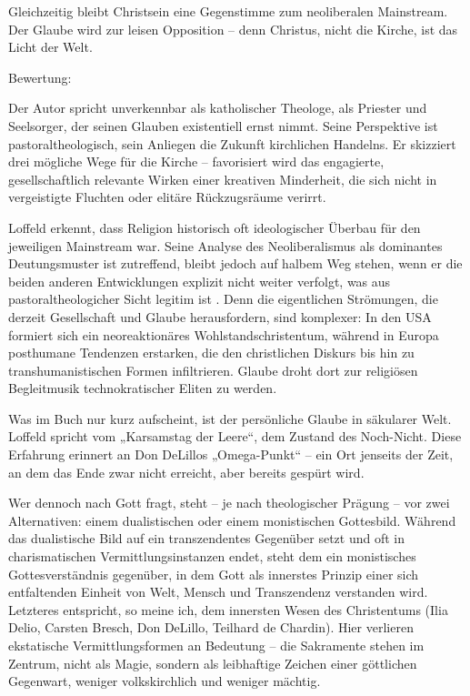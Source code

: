 \documentclass[
]{article}
\begin{document}
Gleichzeitig bleibt Christsein eine Gegenstimme zum neoliberalen Mainstream. Der Glaube wird zur leisen Opposition -- denn Christus, nicht die Kirche, ist das Licht der Welt.

Bewertung:

Der Autor spricht unverkennbar als katholischer Theologe, als Priester und Seelsorger, der seinen Glauben existentiell ernst nimmt. Seine Perspektive ist pastoraltheologisch, sein Anliegen die Zukunft kirchlichen Handelns. Er skizziert drei mögliche Wege für die Kirche -- favorisiert wird das engagierte, gesellschaftlich relevante Wirken einer kreativen Minderheit, die sich nicht in vergeistigte Fluchten oder elitäre Rückzugsräume verirrt.

Loffeld erkennt, dass Religion historisch oft ideologischer Überbau für den jeweiligen Mainstream war. Seine Analyse des Neoliberalismus als dominantes Deutungsmuster ist zutreffend, bleibt jedoch auf halbem Weg stehen, wenn er die beiden anderen Entwicklungen explizit nicht weiter verfolgt, was aus pastoraltheologicher Sicht legitim ist . Denn die eigentlichen Strömungen, die derzeit Gesellschaft und Glaube herausfordern, sind komplexer: In den USA formiert sich ein neoreaktionäres Wohlstandschristentum, während in Europa posthumane Tendenzen erstarken, die den christlichen Diskurs bis hin zu transhumanistischen Formen infiltrieren. Glaube droht dort zur religiösen Begleitmusik technokratischer Eliten zu werden.

Was im Buch nur kurz aufscheint, ist der persönliche Glaube in säkularer Welt. Loffeld spricht vom „Karsamstag der Leere``, dem Zustand des Noch-Nicht. Diese Erfahrung erinnert an Don DeLillos „Omega-Punkt`` -- ein Ort jenseits der Zeit, an dem das Ende zwar nicht erreicht, aber bereits gespürt wird.

Wer dennoch nach Gott fragt, steht -- je nach theologischer Prägung -- vor zwei Alternativen: einem dualistischen oder einem monistischen Gottesbild. Während das dualistische Bild auf ein transzendentes Gegenüber setzt und oft in charismatischen Vermittlungsinstanzen endet, steht dem ein monistisches Gottesverständnis gegenüber, in dem Gott als innerstes Prinzip einer sich entfaltenden Einheit von Welt, Mensch und Transzendenz verstanden wird. Letzteres entspricht, so meine ich, dem innersten Wesen des Christentums (Ilia Delio, Carsten Bresch, Don DeLillo, Teilhard de Chardin). Hier verlieren ekstatische Vermittlungsformen an Bedeutung -- die Sakramente stehen im Zentrum, nicht als Magie, sondern als leibhaftige Zeichen einer göttlichen Gegenwart, weniger volkskirchlich und weniger mächtig.
\end{document}
